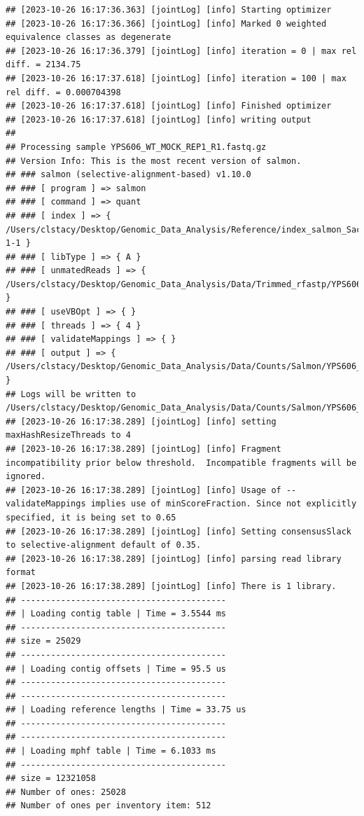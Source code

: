 \documentclass[
]{book}
\begin{document}
\begin{verbatim}
## [2023-10-26 16:17:36.363] [jointLog] [info] Starting optimizer
## [2023-10-26 16:17:36.366] [jointLog] [info] Marked 0 weighted equivalence classes as degenerate
## [2023-10-26 16:17:36.379] [jointLog] [info] iteration = 0 | max rel diff. = 2134.75
## [2023-10-26 16:17:37.618] [jointLog] [info] iteration = 100 | max rel diff. = 0.000704398
## [2023-10-26 16:17:37.618] [jointLog] [info] Finished optimizer
## [2023-10-26 16:17:37.618] [jointLog] [info] writing output 
## 
## Processing sample YPS606_WT_MOCK_REP1_R1.fastq.gz
## Version Info: This is the most recent version of salmon.
## ### salmon (selective-alignment-based) v1.10.0
## ### [ program ] => salmon 
## ### [ command ] => quant 
## ### [ index ] => { /Users/clstacy/Desktop/Genomic_Data_Analysis/Reference/index_salmon_Saccharomyces_cerevisiae.R64-1-1 }
## ### [ libType ] => { A }
## ### [ unmatedReads ] => { /Users/clstacy/Desktop/Genomic_Data_Analysis/Data/Trimmed_rfastp/YPS606_WT_MOCK_REP1_R1.fastq.gz }
## ### [ useVBOpt ] => { }
## ### [ threads ] => { 4 }
## ### [ validateMappings ] => { }
## ### [ output ] => { /Users/clstacy/Desktop/Genomic_Data_Analysis/Data/Counts/Salmon/YPS606_WT_MOCK_REP1_R1.fastq.gz_quant }
## Logs will be written to /Users/clstacy/Desktop/Genomic_Data_Analysis/Data/Counts/Salmon/YPS606_WT_MOCK_REP1_R1.fastq.gz_quant/logs
## [2023-10-26 16:17:38.289] [jointLog] [info] setting maxHashResizeThreads to 4
## [2023-10-26 16:17:38.289] [jointLog] [info] Fragment incompatibility prior below threshold.  Incompatible fragments will be ignored.
## [2023-10-26 16:17:38.289] [jointLog] [info] Usage of --validateMappings implies use of minScoreFraction. Since not explicitly specified, it is being set to 0.65
## [2023-10-26 16:17:38.289] [jointLog] [info] Setting consensusSlack to selective-alignment default of 0.35.
## [2023-10-26 16:17:38.289] [jointLog] [info] parsing read library format
## [2023-10-26 16:17:38.289] [jointLog] [info] There is 1 library.
## -----------------------------------------
## | Loading contig table | Time = 3.5544 ms
## -----------------------------------------
## size = 25029
## -----------------------------------------
## | Loading contig offsets | Time = 95.5 us
## -----------------------------------------
## -----------------------------------------
## | Loading reference lengths | Time = 33.75 us
## -----------------------------------------
## -----------------------------------------
## | Loading mphf table | Time = 6.1033 ms
## -----------------------------------------
## size = 12321058
## Number of ones: 25028
## Number of ones per inventory item: 512

\end{verbatim}
\end{document}
